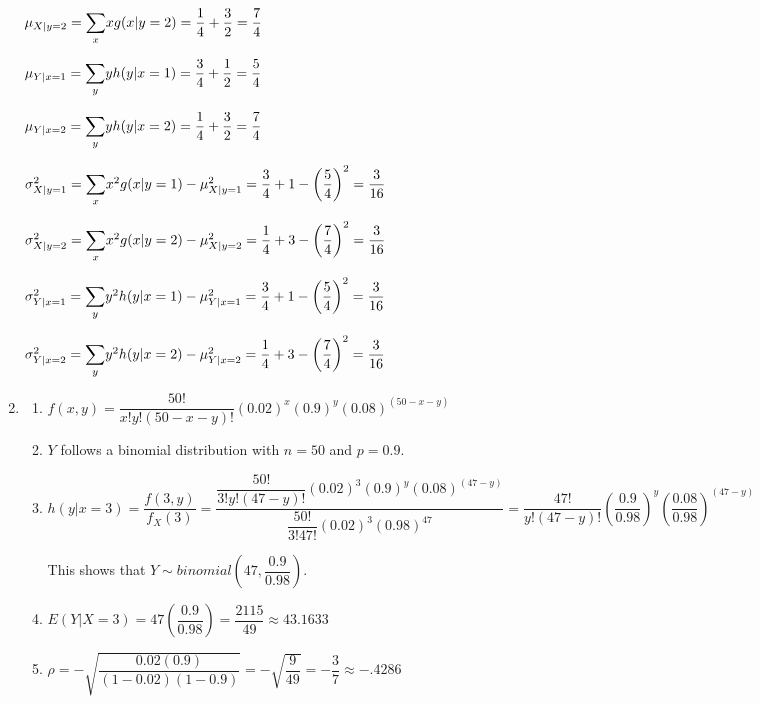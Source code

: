 \documentclass{article}
\newcommand\mfrac[2]{\left(\dfrac{#1}{#2}\right)}
\newcommand\lsum{\mathlarger{\sum}}
\begin{document}
\begin{enumerate}
      $\mu_{X|y=2} = \lsum_x{x g(x|y=2)} = \dfrac{1}{4} + \dfrac{3}{2} = \dfrac{7}{4}$
      
      $\mu_{Y|x=1} = \lsum_y{y h(y|x=1)} = \dfrac{3}{4} + \dfrac{1}{2} = \dfrac{5}{4}$
      
      $\mu_{Y|x=2} = \lsum_y{y h(y|x=2)} = \dfrac{1}{4} + \dfrac{3}{2} = \dfrac{7}{4}$
      
      $\sigma_{X|y=1}^2 = \lsum_x{x^2 g(x|y=1)} - \mu_{X|y=1}^2= \dfrac{3}{4} + 1 - \mfrac{5}{4}^2 
      = \dfrac{3}{16}$
      
      $\sigma_{X|y=2}^2 = \lsum_x{x^2 g(x|y=2)} - \mu_{X|y=2}^2= \dfrac{1}{4} + 3 - \mfrac{7}{4}^2 
      = \dfrac{3}{16}$
      
      $\sigma_{Y|x=1}^2 = \lsum_y{y^2 h(y|x=1)} - \mu_{Y|x=1}^2= \dfrac{3}{4} + 1 - \mfrac{5}{4}^2 
      = \dfrac{3}{16}$
      
      $\sigma_{Y|x=2}^2 = \lsum_y{y^2 h(y|x=2)} - \mu_{Y|x=2}^2= \dfrac{1}{4} + 3 - \mfrac{7}{4}^2 
      = \dfrac{3}{16}$
      
     \item
      \begin{enumerate}
       \item 
	$f(x,y) = \dfrac{50!}{x!y!(50-x-y)!}(0.02)^x (0.9)^y (0.08)^{(50-x-y)}$
       
       \item
	$Y$ follows a binomial distribution with $n=50$ and $p=0.9$.
       
       \item
	$h(y|x=3) = \dfrac{f(3,y)}{f_X(3)} = 
	  \dfrac{\dfrac{50!}{3!y!(47-y)!}(0.02)^3(0.9)^y(0.08)^{(47-y)}}
	    {\dfrac{50!}{3!47!}(0.02)^3(0.98)^{47}}
	  = \dfrac{47!}{y!(47-y)!}\mfrac{0.9}{0.98}^y\mfrac{0.08}{0.98}^{(47-y)}$
	
	This shows that $Y \sim binomial\left(47, \dfrac{0.9}{0.98}\right)$.
       
       \item
	$E(Y|X=3) = 47 \mfrac{0.9}{0.98} = \dfrac{2115}{49} \approx 43.1633$
       
       \item
	$\rho = -\sqrt{\dfrac{0.02(0.9)}{(1 - 0.02)(1 - 0.9)}} = -\sqrt{\dfrac{9}{49}} 
	  = -\dfrac{3}{7} \approx -.4286$
      \end{enumerate}
    \end{enumerate}
\end{document}
